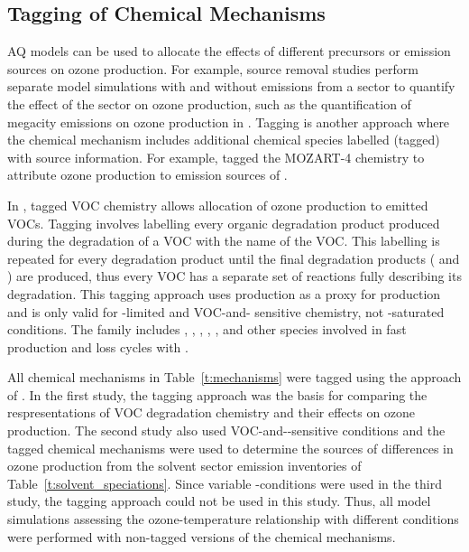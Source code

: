 \subsection{Tagging of Chemical Mechanisms} \label{s:tagging}
AQ models can be used to allocate the effects of different precursors or emission sources on ozone production.
For example, source removal studies perform separate model simulations with and without emissions from a sector to quantify the effect of the sector on ozone production, such as the quantification of megacity emissions on ozone production in \citet{Butler:2009}.
Tagging is another approach where the chemical mechanism includes additional chemical species labelled (tagged) with source information.
For example, \citet{Emmons:2012} tagged the MOZART-4 chemistry to attribute ozone production to emission sources of .

In \citet{Butler:2011}, tagged VOC chemistry allows allocation of ozone production to emitted VOCs.
Tagging involves labelling every organic degradation product produced during the degradation of a VOC with the name of the VOC.
This labelling is repeated for every degradation product until the final degradation products ( and ) are produced, thus every VOC has a separate set of reactions fully describing its degradation.
This tagging approach uses  production as a proxy for  production and is only valid for -limited and VOC-and- sensitive chemistry, not -saturated conditions.
The  family includes , , , , ,  and other species involved in fast production and loss cycles with .

\newpage
All chemical mechanisms in Table~\ref{t:mechanisms} were tagged using the approach of \citet{Butler:2011}.
In the first study, the tagging approach was the basis for comparing the respresentations of VOC degradation chemistry and their effects on ozone production.
The second study also used VOC-and--sensitive conditions and the tagged chemical mechanisms were used to determine the sources of differences in ozone production from the solvent sector emission inventories of Table~\ref{t:solvent_speciations}.
Since variable -conditions were used in the third study, the tagging approach could not be used in this study.
Thus, all model simulations assessing the ozone-temperature relationship with different  conditions were performed with non-tagged versions of the chemical mechanisms.

